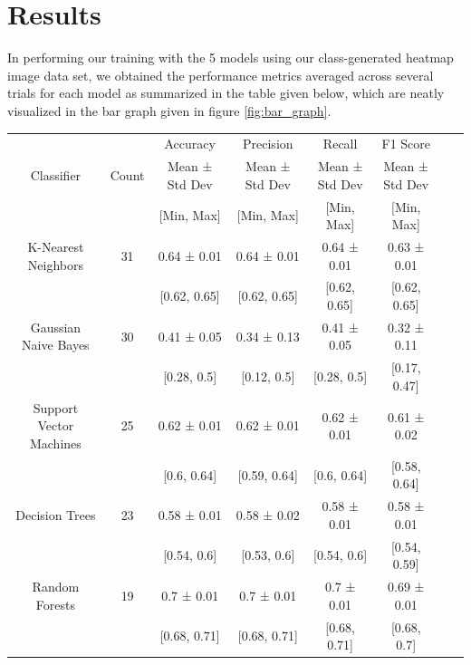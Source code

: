 \documentclass[journal,twocolumn,12pt,twoside]{IEEEtran}
\begin{document}
\section{Results}
In performing our training with the 5 models using our class-generated heatmap image data set, we obtained the performance metrics averaged across several trials for each model as summarized in the table given below, which are neatly visualized in the bar graph given in figure \ref{fig:bar_graph}.

\begin{table}
    \centering
    \fontsize{10}{12}\selectfont
    \captionsetup{font=small, justification=centerfirst}
    \label{tab:metrics}
    \fontsize{10}{12}\selectfont
    \begin{tabular}{*{8}{|c}|}
        \hline
         ~ & ~ & Accuracy & Precision & Recall & F1 Score \\
        Classifier & Count & Mean ± Std Dev & Mean ± Std Dev & Mean ± Std Dev & Mean ± Std Dev \\
        ~ & ~ & [Min, Max] & [Min, Max] & [Min, Max] & [Min, Max] \\
        \hline
        K-Nearest Neighbors & 31 & 0.64 ± 0.01 & 0.64 ± 0.01 & 0.64 ± 0.01 & 0.63 ± 0.01 \\
        & & [0.62, 0.65] & [0.62, 0.65] & [0.62, 0.65] & [0.62, 0.65] \\
        \hline
        Gaussian Naive Bayes & 30 & 0.41 ± 0.05 & 0.34 ± 0.13 & 0.41 ± 0.05 & 0.32 ± 0.11 \\
        & & [0.28, 0.5] & [0.12, 0.5] & [0.28, 0.5] & [0.17, 0.47] \\
        \hline
        Support Vector Machines & 25 & 0.62 ± 0.01 & 0.62 ± 0.01 & 0.62 ± 0.01 & 0.61 ± 0.02 \\
        & & [0.6, 0.64] & [0.59, 0.64] & [0.6, 0.64] & [0.58, 0.64] \\
        \hline
        Decision Trees & 23 & 0.58 ± 0.01 & 0.58 ± 0.02 & 0.58 ± 0.01 & 0.58 ± 0.01 \\
        & & [0.54, 0.6] & [0.53, 0.6] & [0.54, 0.6] & [0.54, 0.59] \\
        \hline
        Random Forests & 19 & 0.7 ± 0.01 & 0.7 ± 0.01 & 0.7 ± 0.01 & 0.69 ± 0.01 \\
        & & [0.68, 0.71] & [0.68, 0.71] & [0.68, 0.71] & [0.68, 0.7] \\
        \hline
    \end{tabular}
\end{table}
\end{document}
